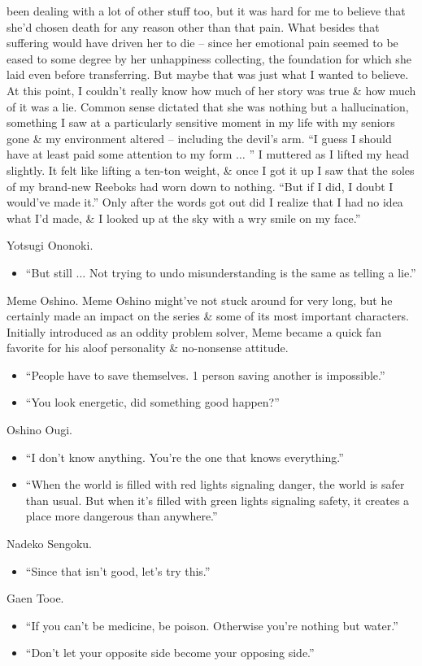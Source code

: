 \documentclass{article}
\begin{document}
\begin{enumerate}
\begin{itemize}
been dealing with a lot of other stuff too, but it was hard for me to believe that she'd chosen death for any reason other than that pain. What besides that suffering would have driven her to die -- since her emotional pain seemed to be eased to some degree by her unhappiness collecting, the foundation for which she laid even before transferring. But maybe that was just what I wanted to believe. At this point, I couldn't really know how much of her story was true \& how much of it was a lie. Common sense dictated that she was nothing but a hallucination, something I saw at a particularly sensitive moment in my life with my seniors gone \& my environment altered -- including the devil's arm. ``I guess I should have at least paid some attention to my form $\ldots$ '' I muttered as I lifted my head slightly. It felt like lifting a ten-ton weight, \& once I got it up I saw that the soles of my brand-new Reeboks had worn down to nothing. ``But if I did, I doubt I would've made it.'' Only after the words got out did I realize that I had no idea what I'd made, \& I looked up at the sky with a wry smile on my face.''
    \end{itemize}
    {\sf Yotsugi Ononoki.}
    \begin{itemize}
    	\item ``But still $\ldots$ Not trying to undo misunderstanding is the same as telling a lie.''
    \end{itemize}
    {\sf Meme Oshino.} Meme Oshino might've not stuck around for very long, but he certainly made an impact on the series \& some of its most important characters. Initially introduced as an oddity problem solver, Meme became a quick fan favorite for his aloof personality \& no-nonsense attitude.
    \begin{itemize}
    	\item ``People have to save themselves. 1 person saving another is impossible.''
    	\item ``You look energetic, did something good happen?''
    \end{itemize}
    {\sf Oshino Ougi.}
    \begin{itemize}
    	\item ``I don't know anything. You're the one that knows everything.''
    	\item ``When the world is filled with red lights signaling danger, the world is safer than usual. But when it's filled with green lights signaling safety, it creates a place more dangerous than anywhere.''
    \end{itemize}
    {\sf Nadeko Sengoku.}
    \begin{itemize}
    	\item ``Since that isn't good, let's try this.''
    \end{itemize}
    {\sf Gaen Tooe.}
    \begin{itemize}
    	\item ``If you can't be medicine, be poison. Otherwise you're nothing but water.''
    	\item ``Don't let your opposite side become your opposing side.''
    \end{itemize}
    

\end{enumerate}
\end{document}
